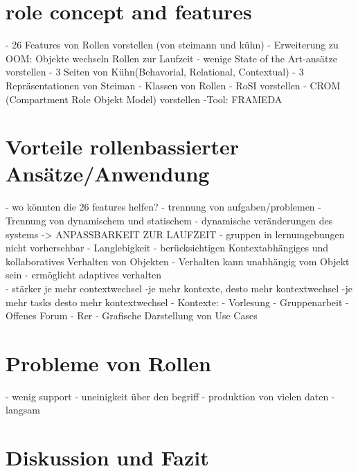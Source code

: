 \documentclass[conference]{IEEEtran}
\begin{document}
\section{role concept and features}
- 26 Features von Rollen vorstellen (von steimann und kühn)
- Erweiterung zu OOM: Objekte wechseln Rollen zur Laufzeit
- wenige State of the Art-ansätze vorstellen
- 3 Seiten von Kühn(Behavorial, Relational, Contextual)
- 3 Repräsentationen von Steiman
	- Klassen von Rollen
- RoSI vorstellen
	- CROM (Compartment Role Objekt Model) vorstellen
		-Tool: FRAMEDA

\section{Vorteile rollenbassierter Ansätze/Anwendung}
- wo könnten die 26 features helfen? 
- trennung von aufgaben/problemen
- Trennung von dynamischem und statischem
- dynamische veränderungen des systems -> ANPASSBARKEIT ZUR LAUFZEIT
	- gruppen in lernumgebungen nicht vorhersehbar
- Langlebigkeit
- berücksichtigen Kontextabhängiges und kollaboratives Verhalten von Objekten \cite{family}
- Verhalten kann unabhängig vom Objekt sein - ermöglicht adaptives verhalten\\
- stärker je mehr contextwechsel
	-je mehr kontexte, desto mehr kontextwechsel
		-je mehr tasks desto mehr kontextwechsel
- Kontexte:
	- Vorlesung
	- Gruppenarbeit
	- Offenes Forum
	- Rer
- Grafische Darstellung von Use Cases

\section{Probleme von Rollen}
- wenig support
- uneinigkeit über den begriff 
- produktion von vielen daten
- langsam \cite{bachman}


\section{Diskussion und Fazit}

{}

\end{document}
